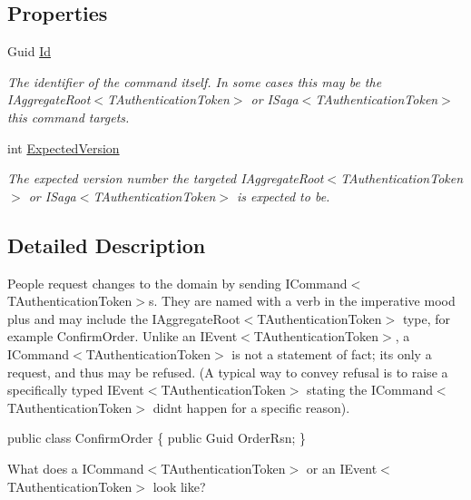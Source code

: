 \subsection*{Properties}
\begin{DoxyCompactItemize}
\item 
Guid \hyperlink{interfaceCqrs_1_1Commands_1_1ICommand_a79acca2013a08295cef32f1917d97e96_a79acca2013a08295cef32f1917d97e96}{Id}
\begin{DoxyCompactList}\small\item\em The identifier of the command itself. In some cases this may be the I\+Aggregate\+Root$<$\+T\+Authentication\+Token$>$ or I\+Saga$<$\+T\+Authentication\+Token$>$ this command targets. \end{DoxyCompactList}\item 
int \hyperlink{interfaceCqrs_1_1Commands_1_1ICommand_a8b207da81f36bd4426e83e2ec948eb49_a8b207da81f36bd4426e83e2ec948eb49}{Expected\+Version}
\begin{DoxyCompactList}\small\item\em The expected version number the targeted I\+Aggregate\+Root$<$\+T\+Authentication\+Token$>$ or I\+Saga$<$\+T\+Authentication\+Token$>$ is expected to be. \end{DoxyCompactList}\end{DoxyCompactItemize}


\subsection{Detailed Description}
People request changes to the domain by sending I\+Command$<$\+T\+Authentication\+Token$>$s. They are named with a verb in the imperative mood plus and may include the I\+Aggregate\+Root$<$\+T\+Authentication\+Token$>$ type, for example Confirm\+Order. Unlike an I\+Event$<$\+T\+Authentication\+Token$>$, a I\+Command$<$\+T\+Authentication\+Token$>$ is not a statement of fact; it\textquotesingle{}s only a request, and thus may be refused. (A typical way to convey refusal is to raise a specifically typed I\+Event$<$\+T\+Authentication\+Token$>$ stating the I\+Command$<$\+T\+Authentication\+Token$>$ didn\textquotesingle{}t happen for a specific reason). 

public class Confirm\+Order \{ public Guid Order\+Rsn; \} 

What does a I\+Command$<$\+T\+Authentication\+Token$>$ or an I\+Event$<$\+T\+Authentication\+Token$>$ look like?

